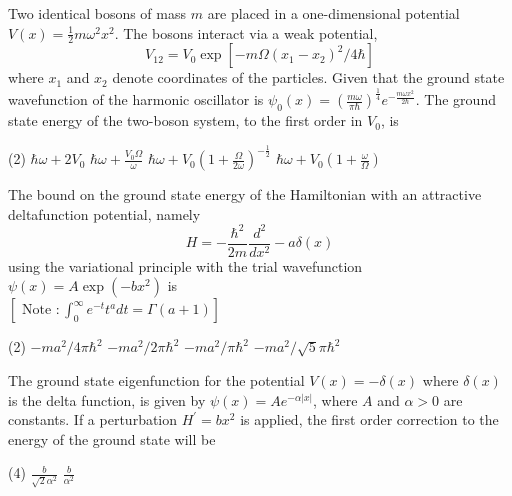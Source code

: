 \begin{enumerate}
\begin{minipage}{\textwidth}
	\item Two identical bosons of mass $m$ are placed in a one-dimensional potential $V(x)=\frac{1}{2} m \omega^{2} x^{2} .$ The bosons interact via a weak potential,
	$$
	V_{12}=V_{0} \exp \left[-m \Omega\left(x_{1}-x_{2}\right)^{2} / 4 \hbar\right]
	$$
	where $x_{1}$ and $x_{2}$ denote coordinates of the particles. Given that the ground state wavefunction of the harmonic oscillator is $\psi_{0}(x)=\left(\frac{m \omega}{\pi \hbar}\right)^{\frac{1}{4}} e^{-\frac{m \omega x^{2}}{2 \hbar}} .$ The ground state energy of the two-boson system, to the first order in $V_{0}$, is
\end{minipage}
\begin{tasks}(2)
	\task[\textbf{A.}] $\hbar \omega+2 V_{0}$
	\task[\textbf{B.}]$\hbar \omega+\frac{V_{0} \Omega}{\omega}$
	\task[\textbf{C.}]$\hbar \omega+V_{0}\left(1+\frac{\Omega}{2 \omega}\right)^{-\frac{1}{2}}$
	\task[\textbf{D.}]$\hbar \omega+V_{0}\left(1+\frac{\omega}{\Omega}\right)$
\end{tasks}
\begin{minipage}{\textwidth}
	\item The bound on the ground state energy of the Hamiltonian with an attractive deltafunction potential, namely
	$$
	H=-\frac{\hbar^{2}}{2 m} \frac{d^{2}}{d x^{2}}-a \delta(x)
	$$
	using the variational principle with the trial wavefunction $\psi(x)=A \exp \left(-b x^{2}\right)$ is\\
	$\left[\text { Note }: \int_{0}^{\infty} e^{-t} t^{a} d t=\Gamma(a+1)\right]$
\end{minipage}
\begin{tasks}(2)
	\task[\textbf{A.}] $-m a^{2} / 4 \pi \hbar^{2}$
	\task[\textbf{B.}]$-m a^{2} / 2 \pi \hbar^{2}$
	\task[\textbf{C.}]$-m a^{2} / \pi \hbar^{2}$
	\task[\textbf{D.}]$-m a^{2} / \sqrt{5} \pi \hbar^{2}$
\end{tasks}
\begin{minipage}{\textwidth}
	\item The ground state eigenfunction for the potential $V(x)=-\delta(x)$ where $\delta(x)$ is the delta function, is given by $\psi(x)=A e^{-\alpha|x|}$, where $A$ and $\alpha>0$ are constants. If a perturbation $H^{\prime}=b x^{2}$ is applied, the first order correction to the energy of the ground state will be
\end{minipage}
\begin{tasks}(4)
	\task[\textbf{A.}] $\frac{b}{\sqrt{2} \alpha^{2}}$ 
	\task[\textbf{B.}]$\frac{b}{\alpha^{2}}$

\end{tasks}
\end{enumerate}
